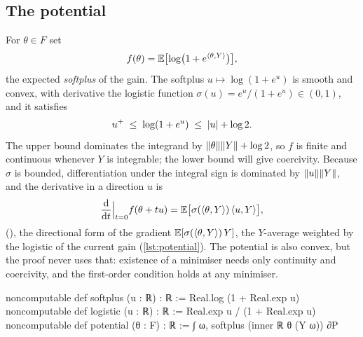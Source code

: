 \documentclass[11pt]{article}
\begin{document}
\subsection{The potential}
For $\theta\in F$ set
\[
  f(\theta)=\mathbb{E}\bigl[\log\bigl(1+e^{\langle\theta,Y\rangle}\bigr)\bigr],
\]
the expected \emph{softplus} of the gain. The softplus $u\mapsto\log(1+e^u)$ is smooth and convex, with
derivative the logistic function $\sigma(u)=e^u/(1+e^u)\in(0,1)$, and it satisfies
\[
  u^+\;\le\;\log(1+e^u)\;\le\;\lvert u\rvert+\log 2 .
\]
The upper bound dominates the integrand by $\lVert \theta\rVert\lVert Y\rVert+\log2$, so $f$ is finite and continuous
whenever $Y$ is integrable; the lower bound will give coercivity. Because $\sigma$ is bounded,
differentiation under the integral sign is dominated by $\lVert u\rVert\lVert Y\rVert$, and the derivative in a direction
$u$ is
\[
  \frac{\mathrm{d}}{\mathrm{d} t}\Big|_{t=0} f(\theta+tu)=\mathbb{E}\bigl[\sigma(\langle\theta,Y\rangle)\,\langle u,Y\rangle\bigr],
\]
(), the directional form of the gradient $\mathbb{E}[\sigma(\langle\theta,Y\rangle)\,Y]$, the $Y$-average weighted by the
logistic of the current gain (\cref{lst:potential}). The potential is also convex, but the proof never
uses that: existence of a minimiser needs only continuity and coercivity, and the first-order condition
holds at any minimiser.

\begin{leancode}[caption={The softplus potential (\texttt{Foundations/FTAPOnePeriodVector}).},label=lst:potential]
noncomputable def softplus (u : ℝ) : ℝ := Real.log (1 + Real.exp u)
noncomputable def logistic (u : ℝ) : ℝ := Real.exp u / (1 + Real.exp u)
noncomputable def potential (θ : F) : ℝ :=
  ∫ ω, softplus (inner ℝ θ (Y ω)) ∂P
\end{leancode}
\end{document}
